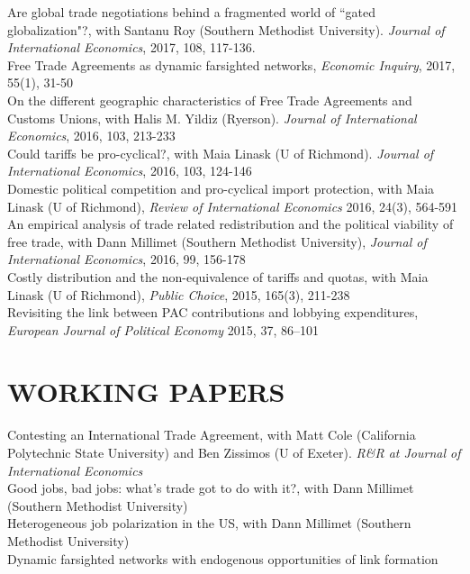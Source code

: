\documentclass[11pt]{res}
\begin{document}
\begin{resume}
{Are global trade negotiations behind a fragmented world of ``gated globalization"?}, with Santanu Roy (Southern Methodist University). \emph{Journal of International Economics}, 2017, 108, 117-136.\vspace{1.5mm}\\
{ Free Trade Agreements as dynamic farsighted networks}, \emph{Economic Inquiry}, 2017, 55(1), 31-50\vspace{1.5mm}\\
{On the different geographic characteristics of Free Trade Agreements and Customs Unions}, with Halis M. Yildiz (Ryerson). \emph{Journal of International Economics}, 2016, 103, 213-233 \vspace{1.5mm}\\
{Could tariffs be pro-cyclical?}, with Maia Linask (U of Richmond). \emph{Journal of International Economics}, 2016, 103, 124-146 \vspace{1.5mm}\\
{Domestic political competition and pro-cyclical import protection}, with Maia Linask (U of Richmond), \emph{Review of International Economics} 2016, 24(3), 564-591\vspace{1.5mm}\\
{An empirical analysis of trade related redistribution and the political viability of free trade}, with Dann Millimet (Southern Methodist University), \emph{Journal of International Economics}, 2016, 99, 156-178 \vspace{1.5mm}\\
{Costly distribution and the non-equivalence of tariffs and quotas}, with Maia Linask (U of Richmond), \emph{Public Choice}, 2015, 165(3), 211-238 \vspace{1.5mm}\\
{Revisiting the link between PAC contributions and lobbying expenditures, \emph{European Journal of Political Economy}} 2015, 37, 86--101

\section{WORKING PAPERS}\vspace{1.5mm}
{Contesting an International Trade Agreement}, with Matt Cole (California Polytechnic State University) and Ben Zissimos (U of Exeter). \emph{R\&R at Journal of International Economics}\vspace{1.5mm}\\
{Good jobs, bad jobs: what's trade got to do with it?}, with Dann Millimet (Southern Methodist University)\vspace{1.5mm}\\
{Heterogeneous job polarization in the US}, with Dann Millimet (Southern Methodist University)\vspace{1.5mm}\\
{Dynamic farsighted networks with endogenous opportunities of link formation}


\end{resume}
\end{document}
